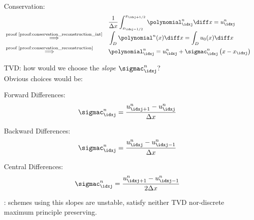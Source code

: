 \begin{sectionbox}\nospacing
   \begin{circlelistnosep}
       \item Conservation:
       \begin{align*}
         &&&\frac{1}{\Delta x}\int_{x_{\idxj-1/2}}^{x_{\idxj+1/2}}\polynomial_{\idxj}^{n}\diff x=u_{\idxj}^{n}\\[-1\jot]
         &\stackrel{\text{proof~\ref{proof:conservation_reconstruction_int}}}{\implies}&&\int_{D}\polynomial^{n}(x)\diff x=\int_{D}u_{0}(x)\diff x \\[-1\jot]
         &\stackrel{\text{proof~\ref{proof:conservation_reconstruction}}}{\implies}&&\polynomial_{\idxj}^{n}=u_{\idxj}^{n}+\sigmac_{\idxj}^{n} \left(x-x_{\idxj}\right)
       \end{align*}
       \item TVD: how would we choose the \textit{slope} $\sigmac_{\idxj}^{n}$?\\
       Obvious choices would be:
       \begin{itemizenosep}
           \item Forward Differences:
           \begin{align*}
             \sigmac_{\idxj}^{n}=\frac{u_{\idxj+1}^{n}-u_{\idxj}^{n}}{\Delta x}
           \end{align*}
           \item Backward Differences:
           \begin{align*}
             \sigmac_{\idxj}^{n}=\frac{u_{\idxj}^{n}-u_{\idxj-1}^{n}}{\Delta x}
           \end{align*}
           \item Central Differences:
           \begin{align*}
             \sigmac_{\idxj}^{n}=\frac{u_{\idxj+1}^{n}-u_{\idxj-1}^{n}}{2\Delta x}
           \end{align*}
       \end{itemizenosep}
   \end{circlelistnosep}
   : schemes using this slopes are unstable, satisfy neither TVD nor-discrete maximum principle preserving.
\end{sectionbox}


